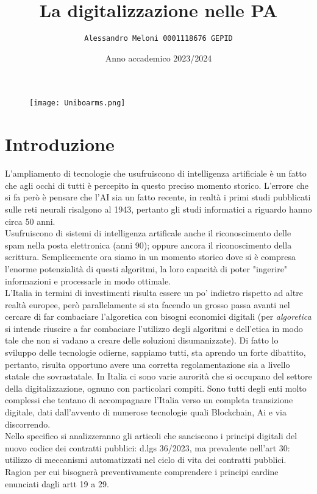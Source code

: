 \documentclass{article}
\title{\huge\textbf{La digitalizzazione nelle PA}}
\author{\texttt{Alessandro Meloni 0001118676 GEPID}}
\date{Anno accademico 2023/2024}
\begin{document}
\begin{figure}
    \centering
    \texttt{[image: Uniboarms.png]}
\end{figure}
\maketitle

\centering \tableofcontents

\newpage\centering
\section{Introduzione}
\begin{justify}
L'ampliamento di tecnologie che usufruiscono di intelligenza artificiale è un fatto che agli occhi di tutti è percepito in questo preciso momento storico. L'errore che si fa però è pensare che l'AI sia un fatto recente, in realtà i primi studi pubblicati sulle reti neurali risalgono al 1943, pertanto gli studi informatici a riguardo hanno circa 50 anni.\citep{mcculloch1943logical}\\ Usufruiscono di sistemi di intelligenza artificale anche il riconoscimento delle spam nella posta elettronica (anni 90); oppure ancora il riconoscimento della scrittura. Semplicemente ora siamo in un momento storico dove si è compresa l'enorme potenzialità di questi algoritmi, la loro capacità di poter "ingerire" informazioni e processarle in modo ottimale.\\
L'Italia in termini di investimenti risulta essere un po' indietro rispetto ad altre realtà europee, però parallelamente si sta facendo un grosso passa avanti nel cercare di far combaciare l'algoretica con bisogni economici digitali (per \textit{algoretica} si intende riuscire a far combaciare l'utilizzo degli algoritmi e dell'etica in modo tale che non si vadano a creare delle soluzioni disumanizzate).
Di fatto lo sviluppo delle tecnologie odierne, sappiamo tutti, sta aprendo un forte dibattito, pertanto, risulta opportuno avere una corretta regolamentazione sia a livello statale che sovrastatale.
In Italia ci sono varie aurorità che si occupano del settore della digitalizzazione, ognuno con particolari compiti.
Sono tutti degli enti molto complessi che tentano di accompagnare l'Italia verso un completa transizione digitale, dati dall'avvento di numerose tecnologie quali Blockchain, Ai e via discorrendo.\\
Nello specifico si analizzeranno gli articoli che sanciscono i principi digitali del nuovo codice dei contratti pubblici: d.lgs 36/2023, ma prevalente nell'art 30: utilizzo di meccanismi automatizzati nel ciclo di vita dei contratti pubblici. Ragion per cui bisognerà preventivamente comprendere i principi cardine enunciati dagli artt 19 a 29.\\

\end{justify}
\end{document}
